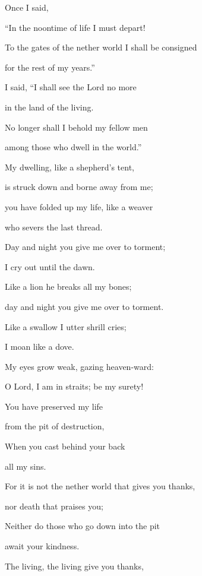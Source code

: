 \noindent Once I said,~\GreStar{}~\nopagebreak

“In the noontime of life I must depart!

\noindent To the gates of the nether world I shall be consigned~\GreStar{}~\nopagebreak

for the rest of my years.”

\noindent I said, “I shall see the Lord no more~\GreStar{}~\nopagebreak

in the land of the living.

\noindent No longer shall I behold my fellow men~\GreStar{}~\nopagebreak

among those who dwell in the world.”

\noindent My dwelling, like a shepherd’s tent,~\GreStar{}~\nopagebreak

is struck down and borne away from me;

\noindent you have folded up my life, like a weaver~\GreStar{}~\nopagebreak

who severs the last thread.

\noindent Day and night you give me over to torment;~\GreStar{}~\nopagebreak

I cry out until the dawn.

\noindent Like a lion he breaks all my bones;~\GreStar{}~\nopagebreak

day and night you give me over to torment.

\noindent Like a swallow I utter shrill cries;~\GreStar{}~\nopagebreak

I moan like a dove.

\noindent My eyes grow weak, gazing heaven-ward:~\GreStar{}~\nopagebreak

O Lord, I am in straits; be my surety!

\noindent You have preserved my life~\GreStar{}~\nopagebreak

from the pit of destruction,

\noindent When you cast behind your back~\GreStar{}~\nopagebreak

all my sins.

\noindent For it is not the nether world that gives you thanks,~\GreStar{}~\nopagebreak

nor death that praises you;

\noindent Neither do those who go down into the pit~\GreStar{}~\nopagebreak

await your kindness.

\noindent The living, the living give you thanks,~\GreStar{}~\nopagebreak

